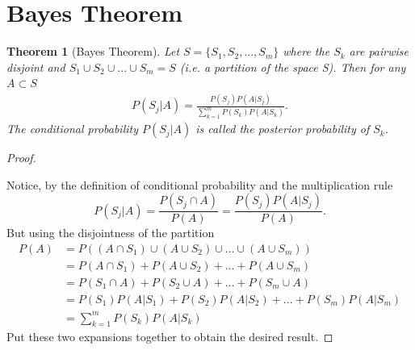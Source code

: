\documentclass[10pt,]{book}
\theoremstyle{plain}
\newtheorem{theorem}{Theorem}[section]
\theoremstyle{definition}
\theoremstyle{definition}
\numberwithin{equation}{section}
\begin{document}
\section[Bayes Theorem]{Bayes Theorem}\label{section-20}
\begin{theorem}[Bayes Theorem]\label{theorem-23}
Let \(S = \{ S_1, S_2, ... , S_m \}\) where the \(S_k\) are pairwise disjoint and \(S_1 \cup S_2 \cup ... \cup S_m = S\) (i.e. a partition of the space S).  Then for any \(A \subset S\)\begin{gather*}
P(S_j | A) = \frac{P(S_j)P(A | S_j)}{\sum_{k=1}^m P(S_k)P(A | S_k)}.
\end{gather*}
		The conditional probability \(P(S_j | A)\) is called the posterior probability of \(S_k\).
		\end{theorem}
\begin{proof}\hypertarget{proof-18}{}

		Notice, by the definition of conditional probability and the multiplication rule
		\begin{equation*}P(S_j | A) = \frac{P(S_j \cap A)}{P(A)} = \frac{P(S_j)P( A | S_j)}{P(A)}.\end{equation*}
		But using the disjointness of the partition 
		\begin{align*}
P(A) & = P( (A \cap S_1) \cup (A \cup S_2) \cup ... \cup (A \cup S_m) )\\
    & = P(A \cap S_1) + P(A \cup S_2) + ... + P(A \cup S_m)\\
    & = P(S_1 \cap A) + P(S_2 \cup A) + ... + P(S_m \cup A)\\
    & = P(S_1) P(A | S_1) + P(S_2)P(A | S_2) + ... + P(S_m)P(A | S_m)\\
    & = \sum_{k=1}^m P(S_k)P(A | S_k)
\end{align*}
		Put these two expansions together to obtain the desired result.
\end{proof}
\end{document}
